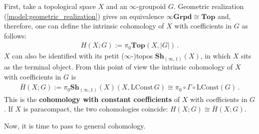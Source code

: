     First, take a topological space $X$ and an $\infty$-groupoid $G$. Geometric realization (\cref{model:geometric_realization}) gives an equivalence $\infty\mathbf{Grpd}\cong\mathbf{Top}$ and, therefore, one can define the intrinsic cohomology of $X$ with coefficients in $G$ as follows:
    \begin{gather}
        H(X;G) := \pi_0\mathbf{Top}(X,|G|)\,.
    \end{gather}
    $X$ can also be identified with its petit ($\infty$-)topos $\mathbf{Sh}_{(\infty,1)}(X)$, in which $X$ sits as the terminal object. From this point of view the intrinsic cohomology of $X$ with coefficients in $G$ is
    \begin{gather}
        \overline{H}(X;G) := \pi_0\mathbf{Sh}_{(\infty,1)}(X)(X,\mathrm{LConst}\,G)\cong\pi_0\circ\Gamma\circ\mathrm{LConst}(G)\,.
    \end{gather}
    This is the \textbf{cohomology with constant coefficients} of $X$ with coefficients in $G$. If $X$ is paracompact, the two cohomologies coincide: $H(X;G)\cong\overline{H}(X;G)$.

    Now, it is time to pass to general cohomology.


